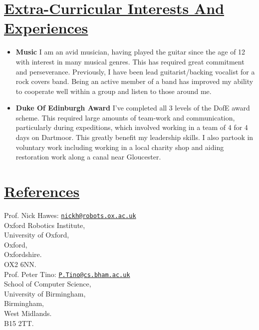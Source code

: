 \documentclass[11pt]{article}
\begin{document}
	\vspace{-20pt}
	\hspace{-100pt}\section*{\underline{Extra-Curricular Interests And Experiences}}
			\begin{itemize}
				\item \textbf{Music} I am an avid musician, having played the guitar since the age of 12 with interest in many musical genres. This has required great commitment and perseverance. Previously, I have been lead guitarist/backing vocalist for a rock covers band. Being an active member of a band has improved my ability to cooperate well within a group and listen to those around me. 
				\item \textbf{Duke Of Edinburgh Award} I've completed all 3 levels of the DofE award scheme. This required large amounts of team-work and communication, particularly during expeditions, which involved working in a team of 4 for 4 days on Dartmoor. This greatly benefit my leadership skills. I also partook in voluntary work including working in a local charity shop and aiding restoration work along a canal near Gloucester.
			\end{itemize}

				
	\vspace{-20pt}
	\hspace{-100pt}\section*{\underline{References}}	
				\begin{multicols}{2}
					\noindent
					Prof. Nick Hawes:  \href{mailto:nickh@robots.ox.ac.uk}{\nolinkurl{nickh@robots.ox.ac.uk}}\\
					Oxford Robotics Institute,\\
					University of Oxford,\\
					Oxford, \\
					Oxfordshire.\\
					OX2 6NN.\\
	
					\noindent
					Prof. Peter Tino:  \href{mailto:P.Tino@cs.bham.ac.uk}{\nolinkurl{P.Tino@cs.bham.ac.uk}}\\
					School of Computer Science,\\
					University of Birmingham,\\
					Birmingham, \\
					West Midlands.\\
					B15 2TT.\\
				\end{multicols}
\end{document}
